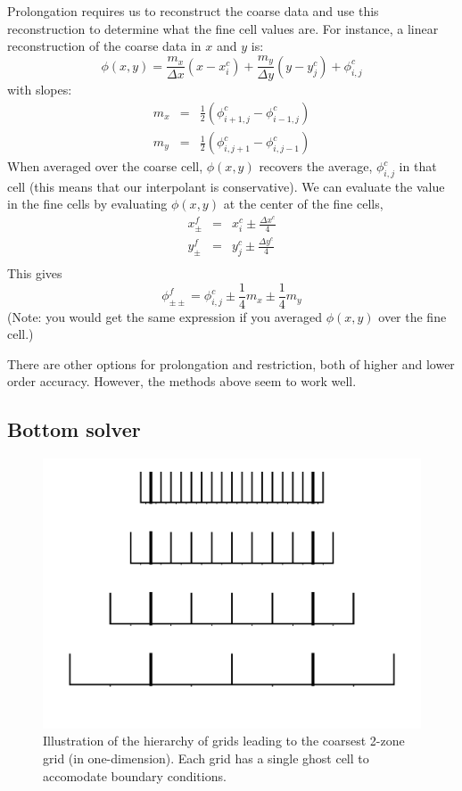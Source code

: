 Prolongation requires us to reconstruct the coarse data and use
this reconstruction to determine what the fine cell values are.  For
instance, a linear reconstruction of the coarse data in $x$ and $y$ is:
\begin{equation}
\phi(x,y) = \frac{m_x}{\Delta x} (x - x_i^c) + 
            \frac{m_y}{\Delta y} (y - y_j^c) + \phi_{i,j}^c
\end{equation}
with slopes:
\begin{eqnarray}
m_x &=& \frac{1}{2}({\phi_{i+1,j}^c - \phi_{i-1,j}^c}) \\
m_y &=& \frac{1}{2}({\phi_{i,j+1}^c - \phi_{i,j-1}^c})
\end{eqnarray}
%
When averaged over the coarse cell, $\phi(x,y)$ recovers the average,
$\phi_{i,j}^c$ in that cell (this means that our interpolant is
conservative).  We can evaluate the value in the fine cells by
evaluating $\phi(x,y)$ at the center of the fine cells,
\begin{eqnarray}
x_\pm^f &=& x_i^c \pm \frac{\Delta x^c}{4} \\
y_\pm^f &=& y_j^c \pm \frac{\Delta y^c}{4} \\
\end{eqnarray}
This gives
\begin{equation}
\phi_{\pm\pm}^f = \phi_{i,j}^c \pm \frac{1}{4}m_x \pm \frac{1}{4}m_y
\end{equation}
(Note: you would get the same expression if you averaged $\phi(x,y)$ over
the fine cell.)

There are other options for prolongation and restriction, both of
higher and lower order accuracy.  However, the methods above seem to
work well.

\subsection{Bottom solver}

\begin{figure}[t]
\centering
\includegraphics[width=\linewidth]{mgtower}
\caption[A multigrid hierarchy.]{\label{fig:mgtower} Illustration of
  the hierarchy of grids leading to the coarsest 2-zone grid (in
  one-dimension).  Each grid has a single ghost cell to accomodate
  boundary conditions.}
\end{figure}

